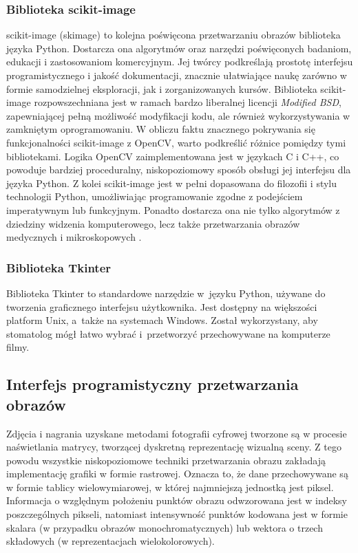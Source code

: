 \subsubsection{Biblioteka scikit-image}
scikit-image (skimage) to kolejna poświęcona przetwarzaniu obrazów biblioteka języka Python. Dostarcza ona algorytmów oraz narzędzi poświęconych badaniom, edukacji i zastosowaniom komercyjnym. Jej twórcy podkreślają prostotę interfejsu programistycznego i jakość dokumentacji, znacznie ułatwiające naukę zarówno w formie samodzielnej eksploracji, jak i zorganizowanych kursów. Biblioteka scikit-image rozpowszechniana jest w ramach bardzo liberalnej licencji \emph{Modified BSD}, zapewniającej pełną możliwość modyfikacji kodu, ale również wykorzystywania w zamkniętym oprogramowaniu. W obliczu faktu znacznego pokrywania się funkcjonalności scikit-image z OpenCV, warto podkreślić różnice pomiędzy tymi bibliotekami. Logika OpenCV zaimplementowana jest w językach C i C++, co powoduje bardziej proceduralny, niskopoziomowy sposób obsługi jej interfejsu dla języka Python. Z kolei scikit-image jest w pełni dopasowana do filozofii i stylu technologii Python, umożliwiając programowanie zgodne z podejściem imperatywnym lub funkcyjnym. Ponadto dostarcza ona nie tylko algorytmów z dziedziny widzenia komputerowego, lecz także przetwarzania obrazów medycznych i mikroskopowych \cite{skimage}.

\subsubsection{Biblioteka Tkinter}
Biblioteka Tkinter\cite{tkinter} to standardowe narzędzie w~języku Python, używane do tworzenia graficznego interfejsu użytkownika. Jest dostępny na większości platform Unix, a~także na systemach Windows.
Został wykorzystany, aby stomatolog mógł łatwo wybrać i~przetworzyć przechowywane na komputerze filmy.

\subsection{Interfejs programistyczny przetwarzania obrazów}

Zdjęcia i nagrania uzyskane metodami fotografii cyfrowej tworzone są w procesie naświetlania matrycy, tworzącej dyskretną reprezentację wizualną sceny. Z tego powodu wszystkie niskopoziomowe techniki przetwarzania obrazu zakładają implementację grafiki w formie rastrowej. Oznacza to, że dane przechowywane są w formie tablicy wielowymiarowej, w której najmniejszą jednostką jest piksel. Informacja o względnym położeniu punktów obrazu odwzorowana jest w indeksy poszczególnych pikseli, natomiast intensywność punktów kodowana jest w formie skalara (w przypadku obrazów monochromatycznych) lub wektora o trzech składowych (w reprezentacjach wielokolorowych).  

